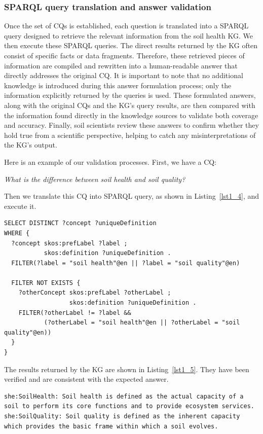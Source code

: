 \documentclass[preprint,12pt]{elsarticle}
\begin{document}
\subsubsection{SPARQL query translation and answer validation}
Once the set of CQs is established, each question is translated into a SPARQL query designed to retrieve the relevant information from the soil health KG. We then execute these SPARQL queries. The direct results returned by the KG often consist of specific facts or data fragments. Therefore, these retrieved pieces of information are compiled and rewritten into a human-readable answer that directly addresses the original CQ. It is important to note that no additional knowledge is introduced during this answer formulation process; only the information explicitly returned by the queries is used. These formulated answers, along with the original CQs and the KG's query results, are then compared with the information found directly in the knowledge sources to validate both coverage and accuracy. Finally, soil scientists review these answers to confirm whether they hold true from a scientific perspective, helping to catch any misinterpretations of the KG's output.

Here is an example of our validation processes. First, we have a CQ:

\textit{What is the difference between soil health and soil quality?}

\noindent Then we translate this CQ into SPARQL query, as shown in Listing~\ref{lst1_4}, and execute it.

\begin{lstlisting}[style=SPARQLStyle, caption={SPARQL query for the difference between soil health and soil quality.}, label={lst1_4}]
SELECT DISTINCT ?concept ?uniqueDefinition
WHERE {
  ?concept skos:prefLabel ?label ;
           skos:definition ?uniqueDefinition .
  FILTER(?label = "soil health"@en || ?label = "soil quality"@en)
  
  FILTER NOT EXISTS {
    ?otherConcept skos:prefLabel ?otherLabel ;
                  skos:definition ?uniqueDefinition .
    FILTER(?otherLabel != ?label && 
           (?otherLabel = "soil health"@en || ?otherLabel = "soil quality"@en))
  }
}
\end{lstlisting}

\noindent The results returned by the KG are shown in Listing~\ref{lst1_5}. They have been verified and are consistent with the expected answer.

\begin{lstlisting}[style=TurtleStyle, caption={Query result.}, label={lst1_5}]
she:SoilHealth: Soil health is defined as the actual capacity of a soil to perform its core functions and to provide ecosystem services.
she:SoilQuality: Soil quality is defined as the inherent capacity which provides the basic frame within which a soil evolves.
\end{lstlisting}
\end{document}
